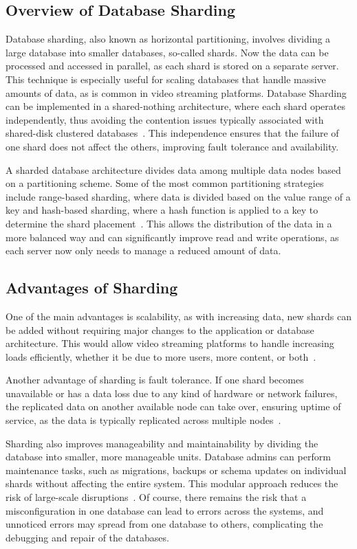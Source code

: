 \subsection{Overview of Database Sharding}
Database sharding, also known as horizontal partitioning, involves dividing a large database into smaller databases, so-called shards. Now the data can be processed and accessed in parallel, as each shard is stored on a separate server. This technique is especially useful for scaling databases that handle massive amounts of data, as is common in video streaming platforms. Database Sharding can be implemented in a shared-nothing architecture, where each shard operates independently, thus avoiding the contention issues typically associated with shared-disk clustered databases~\parencite{db_sharding}. This independence ensures that the failure of one shard does not affect the others, improving fault tolerance and availability.

A sharded database architecture divides data among multiple data nodes based on a partitioning scheme. Some of the most common partitioning strategies include range-based sharding, where data is divided based on the value range of a key and hash-based sharding, where a hash function is applied to a key to determine the shard placement~\parencite{db_sharding}. This allows the distribution of the data in a more balanced way and can significantly improve read and write operations, as each server now only needs to manage a reduced amount of data.

\subsection{Advantages of Sharding}
One of the main advantages is scalability, as with increasing data, new shards can be added without requiring major changes to the application or database architecture. This would allow video streaming platforms to handle increasing loads efficiently, whether it be due to more users, more content, or both~\parencite{db_sharding}.

Another advantage of sharding is fault tolerance. If one shard becomes unavailable or has a data loss due to any kind of hardware or network failures, the replicated data on another available node can take over, ensuring uptime of service, as the data is typically replicated across multiple nodes~\parencite{db_sharding}.

\noindent Sharding also improves manageability and maintainability by dividing the database into smaller, more manageable units. Database admins can perform maintenance tasks, such as migrations, backups or schema updates on individual shards without affecting the entire system. This modular approach reduces the risk of large-scale disruptions~\parencite{db_sharding}. Of course, there remains the risk that a misconfiguration in one database can lead to errors across the systems, and unnoticed errors may spread from one database to others, complicating the debugging and repair of the databases.

